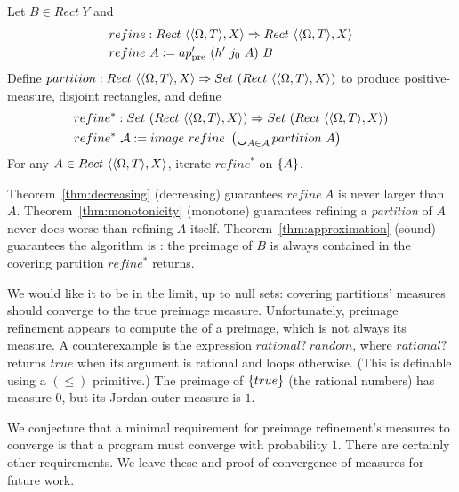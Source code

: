 \begin{definition}
\label{def:preimage-refinement}
Let $B \in Rect~Y$ and
\begin{equation}
\begin{aligned}
	&refine : Rect~\langle{\langle{\Omega,T}\rangle,X}\rangle \Rightarrow Rect~\langle{\langle{\Omega,T}\rangle,X}\rangle \\
	&refine~A := ap_\mathrm{pre}'~(h'~j_0~A)~B
\end{aligned}
\end{equation}
Define $partition : Rect~\langle{\langle{\Omega,T}\rangle,X}\rangle \Rightarrow Set~(Rect~\langle{\langle{\Omega,T}\rangle,X}\rangle)$ to produce positive-measure, disjoint rectangles, and define
\begin{equation}
\begin{aligned}
	&refine^* : Set~(Rect~\langle{\langle{\Omega,T}\rangle,X}\rangle) \Rightarrow Set~(Rect~\langle{\langle{\Omega,T}\rangle,X}\rangle) \\
	&refine^*~\mathcal{A} := image~refine~\left(\textstyle\bigcup_{A \in \mathcal{A}} partition~A \right)
\end{aligned}
\end{equation}
For any $A \in Rect~\langle{\langle{\Omega,T}\rangle,X}\rangle$, iterate $refine^*$ on $\{{A}\}$.
\end{definition}

Theorem~\ref{thm:decreasing} (decreasing) guarantees $refine~A$ is never larger than $A$.
Theorem~\ref{thm:monotonicity} (monotone) guarantees refining a \emph{partition} of $A$ never does worse than refining $A$ itself.
Theorem~\ref{thm:approximation} (sound) guarantees the algorithm is : the preimage of $B$ is always contained in the covering partition $refine^*$ returns.

We would like it to be  in the limit, up to null sets: covering partitions' measures should converge to the true preimage measure.
Unfortunately, preimage refinement appears to compute the  of a preimage, which is not always its measure.
A counterexample is the expression $rational?~random$, where $rational?$ returns $true$ when its argument is rational and loops otherwise.
(This is definable using a $(\leq)$ primitive.)
The preimage of $\{{true}\}$ (the rational numbers) has measure $0$, but its Jordan outer measure is $1$.

We conjecture that a minimal requirement for preimage refinement's measures to converge is that a program must converge with probability $1$.
There are certainly other requirements.
We leave these and proof of convergence of measures for future work.

